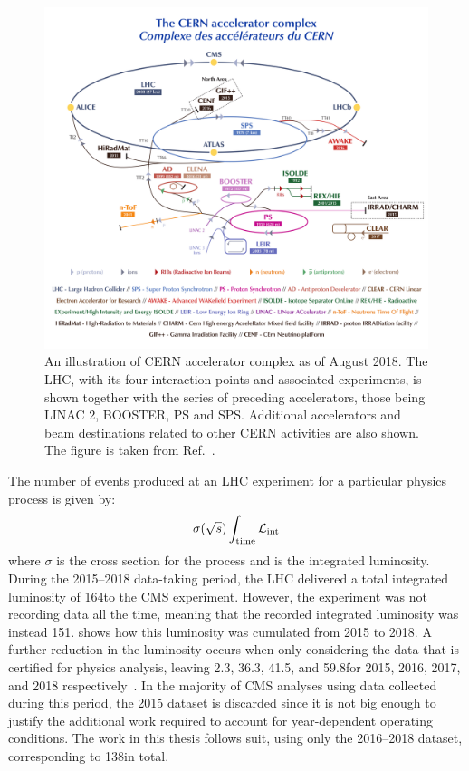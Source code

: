\begin{figure}
  \centering
  \includegraphics[width=\textwidth]{Figures/Detector/LHC/complex.pdf}
  \caption[The CERN Accelerator Complex]{An illustration of CERN accelerator complex as of August 2018. The LHC, with its four interaction points and associated experiments, is shown together with the series of preceding accelerators, those being LINAC 2, BOOSTER, PS and SPS. Additional accelerators and beam destinations related to other CERN activities are also shown. The figure is taken from Ref.~\cite{Mobs:2636343}.}\label{fig:complex}
\end{figure}

The number of events produced at an LHC experiment for a particular physics process is given by:
\begin{equation}
  \sigma(\sqrt{s}) \int_{\text{time}} \mathcal{L}_\text{int}
\end{equation}
where $\sigma$ is the cross section for the process and \Lint is the integrated luminosity. During the 2015--2018 data-taking period, the LHC delivered a total integrated luminosity of 164\fbinv to the CMS experiment. However, the experiment was not recording data all the time, meaning that the recorded integrated luminosity was instead 151\fbinv.  shows how this luminosity was cumulated from 2015 to 2018. A further reduction in the luminosity occurs when only considering the data that is certified for physics analysis, leaving 2.3\fbinv, 36.3\fbinv, 41.5\fbinv, and 59.8\fbinv for 2015, 2016, 2017, and 2018 respectively~\cite{CMS-PAS-LUM-17-004,CMS-PAS-LUM-18-002,CMS:2021xjt}. In the majority of CMS analyses using data collected during this period, the 2015 dataset is discarded since it is not big enough to justify the additional work required to account for year-dependent operating conditions. The work in this thesis follows suit, using only the 2016--2018 dataset, corresponding to 138\fbinv in total.

